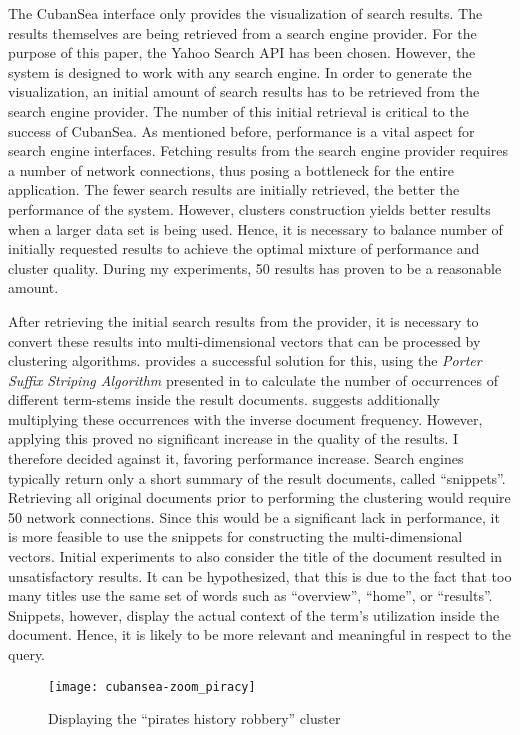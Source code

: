 The CubanSea interface only provides the visualization of search results. The results themselves are being retrieved from a search engine provider. For the purpose of this paper, the Yahoo Search API \cite{YahooSearchAPI} has been chosen. However, the system is designed to work with any search engine. In order to generate the visualization, an initial amount of search results has to be retrieved from the search engine provider. The number of this initial retrieval is critical to the success of CubanSea. As mentioned before, performance is a vital aspect for search engine interfaces. Fetching results from the search engine provider requires a number of network connections, thus posing a bottleneck for the entire application. The fewer search results are initially retrieved, the better the performance of the system. However, clusters construction yields better results when a larger data set is being used. Hence, it is necessary to balance number of initially requested results to achieve the optimal mixture of performance and cluster quality. During my experiments, 50 results has proven to be a reasonable amount.

After retrieving the initial search results from the provider, it is necessary to convert these results into multi-dimensional vectors that can be processed by clustering algorithms. \cite{Hoeber2006a} provides a successful solution for this, using the \emph{Porter Suffix Striping Algorithm} presented in \cite{Porter1997} to calculate the number of occurrences of different term-stems inside the result documents. \cite{Rauber2000} suggests additionally multiplying these occurrences with the inverse document frequency. However, applying this proved no significant increase in the quality of the results. I therefore decided against it, favoring performance increase. Search engines typically return only a short summary of the result documents, called ``snippets''. Retrieving all original documents prior to performing the clustering would require 50 network connections. Since this would be a significant lack in performance, it is more feasible to use the snippets for constructing the multi-dimensional vectors. Initial experiments to also consider the title of the document resulted in unsatisfactory results. It can be hypothesized, that this is due to the fact that too many titles use the same set of words such as ``overview'', ``home'', or ``results''. Snippets, however, display the actual context of the term's utilization inside the document. Hence, it is likely to be more relevant and meaningful in respect to the query.
\begin{figure*}[!t]
	\centering
	\texttt{[image: cubansea-zoom\_piracy]}
	\caption{Displaying the ``pirates history robbery'' cluster}
	\label{fig:zoom:piracy}
\end{figure*}

